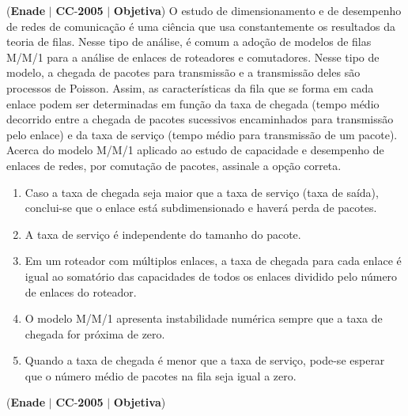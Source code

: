 \documentclass{exam}
\begin{document}
\begin{questions}
\question (\textbf{Enade} $|$ \textbf{CC}-\textbf{2005} $|$ \textbf{Objetiva})
O estudo de dimensionamento e de desempenho de redes de
comunicação é uma ciência que usa constantemente os resultados da
teoria de filas. Nesse tipo de análise, é comum a adoção de modelos
de filas M/M/1 para a análise de enlaces de roteadores e
comutadores. Nesse tipo de modelo, a chegada de pacotes para
transmissão e a transmissão deles são processos de Poisson. Assim,
as características da fila que se forma em cada enlace podem ser
determinadas em função da taxa de chegada (tempo médio decorrido
entre a chegada de pacotes sucessivos encaminhados para
transmissão pelo enlace) e da taxa de serviço (tempo médio para
transmissão de um pacote). Acerca do modelo M/M/1 aplicado ao
estudo de capacidade e desempenho de enlaces de redes, por
comutação de pacotes, assinale a opção correta.
	\begin{enumerate}[label=\alph*)]
		\item  Caso a taxa de chegada seja maior que a taxa de serviço (taxa de
saída), conclui-se que o enlace está subdimensionado e haverá
perda de pacotes.
		\item  A taxa de serviço é independente do tamanho do pacote.
		\item  Em um roteador com múltiplos enlaces, a taxa de chegada para
cada enlace é igual ao somatório das capacidades de todos os
enlaces dividido pelo número de enlaces do roteador.
		\item  O modelo M/M/1 apresenta instabilidade numérica sempre que
a taxa de chegada for próxima de zero.
		\item  Quando a taxa de chegada é menor que a taxa de serviço,
pode-se esperar que o número médio de pacotes na fila seja igual
a zero.
	\end{enumerate}

\question (\textbf{Enade} $|$ \textbf{CC}-\textbf{2005} $|$ \textbf{Objetiva})


\end{questions}
\end{document}
